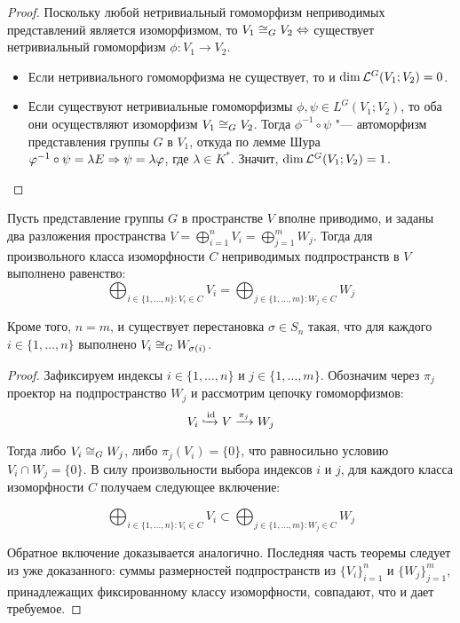 \begin{proof}
	Поскольку любой нетривиальный гомоморфизм неприводимых представлений является изоморфизмом, то $V_1 \cong_G V_2 \Leftrightarrow$ существует нетривиальный гомоморфизм $\phi : V_1 \to V_2$.
	\begin{itemize}
		\item Если нетривиального гомоморфизма не существует, то и $\dim{\mathcal L^G(V_1; V_2)} = 0$.
		\item Если существуют нетривиальные гомоморфизмы $\phi, \psi \in L^G(V_1; V_2)$, то оба они осуществляют изоморфизм $V_1 \cong_G V_2$. Тогда $\phi^{-1}\circ\psi$ "--- автоморфизм представления группы $G$ в $V_1$, откуда по лемме Шура $\varphi^{-1}\circ\psi = \lambda E \Rightarrow \psi = \lambda \varphi$, где $\lambda \in K^*$. Значит, $\dim{\mathcal L^G(V_1; V_2)} = 1$.\qedhere
	\end{itemize}
\end{proof}

\begin{theorem}
	Пусть представление группы $G$ в пространстве $V$ вполне приводимо, и заданы два разложения пространства $V = \bigoplus_{i = 1}^nV_i = \bigoplus_{j = 1}^mW_j$. Тогда для произвольного класса изоморфности $C$ неприводимых подпространств в $V$ выполнено равенство:
	\[\bigoplus_{i \in \{1, \dotsc, n\} : V_i \in C}V_i = \bigoplus_{j \in \{1, \dotsc, m\}: W_j \in C}W_j\]
	
	Кроме того, $n = m$, и существует перестановка $\sigma \in S_n$ такая, что для каждого $i \in \{1, \dotsc, n\}$ выполнено $V_i \cong_G W_{\sigma(i)}$.
\end{theorem}

\begin{proof}
	Зафиксируем индексы $i\in \{1, \dotsc, n\}$ и $j \in \{1, \dotsc, m\}$. Обозначим через $\pi_j$ проектор на подпространство $W_j$ и рассмотрим цепочку гомоморфизмов:
	\[V_i \xhookrightarrow[]{\mathrm{id}} V \xrightarrow{\pi_j} W_j\]
	
	Тогда либо $V_i \cong_G W_j$, либо $\pi_j(V_i) = \{0\}$, что равносильно условию $V_i \cap W_j = \{0\}$. \pagebreak В силу произвольности выбора индексов $i$ и $j$, для каждого класса изоморфности $C$ получаем  следующее включение:
	
	\[\bigoplus_{i \in \{1, \dotsc, n\} : V_i \in C}V_i \subset \bigoplus_{j \in \{1, \dotsc, m\}: W_j \in C}W_j\]
	
	Обратное включение доказывается аналогично. Последняя часть теоремы следует из уже доказанного: суммы размерностей подпространств из $\{V_i\}_{i = 1}^n$ и $\{W_j\}_{j = 1}^m$, принадлежащих фиксированному классу изоморфности, совпадают, что и дает требуемое.
\end{proof}

